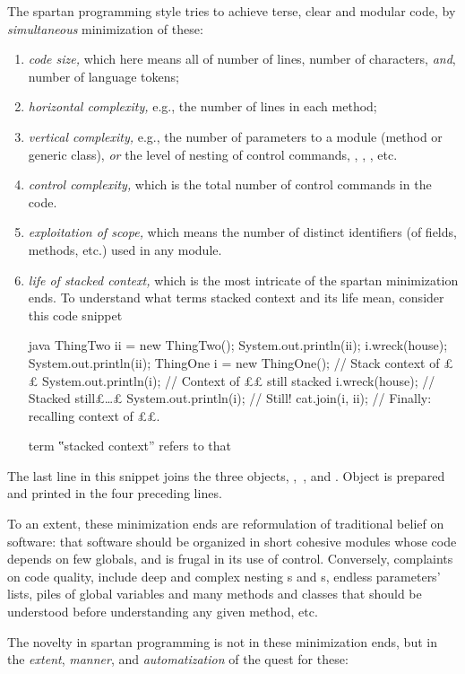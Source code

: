 The spartan programming style tries to achieve terse, clear and modular code,
by \textit{simultaneous} minimization of these:
\begin{enumerate}
  \item \textit{code size,} which here means all of number of lines, number of
    characters, \emph{and}, number of language tokens;
  \item \textit{horizontal complexity,} e.g., the number of lines in each
    method;
  \item \textit{vertical complexity,} e.g., the number of parameters to a
    module (method or generic class), \emph{or} the level of nesting of control
    commands, , , , etc.
  \item \textit{control complexity,} which is the total number of control
    commands in the code.
  \item \textit{exploitation of scope,} which means the number of distinct
    identifiers (of fields, methods, etc.) used in any module.
  \item \textit{life of stacked context,} which is the most intricate of the
    spartan minimization ends. To understand what terms
    stacked context and its life mean, consider
    this code snippet
    \begin{code}{java}
ThingTwo ii = new ThingTwo();
System.out.println(ii);
i.wreck(house);
System.out.println(ii);
ThingOne i = new ThingOne(); // Stack context of ££
System.out.println(i); // Context of ££ still stacked
i.wreck(house); // Stacked still£…£
System.out.println(i); // Still!
cat.join(i, ii); // Finally: recalling context of ££.
    \end{code}
    term ‟stacked context” refers to that
\end{enumerate}
The last line in this snippet joins the three objects,
,~, and . Object  is prepared
and printed in the four preceding lines.


To an extent, these minimization ends are reformulation of traditional
belief on software: that software should be organized in short cohesive modules
whose code depends on few globals, and is frugal in its use of control.
Conversely, complaints on code quality, include deep and complex nesting
s and s, endless parameters' lists, piles of global variables
and many methods and classes that should be understood before understanding any
given method, etc.

The novelty in spartan programming is not in these minimization ends, but in
the \emph{extent}, \emph{manner}, and \emph{automatization} of the quest for
these:

